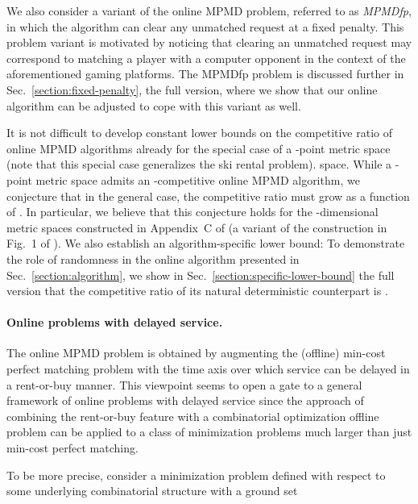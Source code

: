 \documentclass[11pt]{article}
\def\LongVersion{}
\def\LongVersionEnd{}
\def\ShortVersion{}
\def\ShortVersionEnd{}
\theoremstyle{definition}
\theoremstyle{plain}
\theoremstyle{definition}
\theoremstyle{plain}
\theoremstyle{definition}
\theoremstyle{plain}
\newcommand{\Sect}{Sec.}
\begin{document}
We also consider a variant of the online MPMD problem, referred to as
\emph{MPMDfp}, in which the algorithm can clear any unmatched request at a
fixed penalty.
This problem variant is motivated by noticing that clearing an unmatched
request may correspond to matching a player with a computer opponent in the
context of the aforementioned gaming platforms.
The MPMDfp problem is discussed further in
\LongVersion \Sect{}~\ref{section:fixed-penalty},
\LongVersionEnd \ShortVersion the full version,
\ShortVersionEnd where we show that our online algorithm can be adjusted to cope with this
variant as well.

It is not difficult to develop constant lower bounds on the competitive ratio
of online MPMD algorithms already for the special case of a -point metric
\LongVersion space (note that this special case generalizes the ski rental problem).
\LongVersionEnd \ShortVersion space.
\ShortVersionEnd While a -point metric space admits an -competitive online MPMD
algorithm, we conjecture that in the general case, the competitive ratio must
grow as a function of .
In particular, we believe that this conjecture holds for the -dimensional
metric spaces constructed in Appendix~C of \cite{EmekLW2015} (a variant of the
construction in Fig.~1 of \cite{ReingoldT1981}).
We also establish an algorithm-specific lower bound:
To demonstrate the role of randomness in the online algorithm presented in
\Sect{}~\ref{section:algorithm}, we show in
\LongVersion \Sect{}~\ref{section:specific-lower-bound}
\LongVersionEnd \ShortVersion the full version
\ShortVersionEnd that the competitive ratio of its natural deterministic counterpart is .

\paragraph{Online problems with delayed service.}
The online MPMD problem is obtained by augmenting the (offline) min-cost
perfect matching problem with the time axis over which service can be delayed
in a rent-or-buy manner.
This viewpoint seems to open a gate to a general framework of online problems
with delayed service since the approach of combining the rent-or-buy feature
with a combinatorial optimization offline problem can be applied to a class of
minimization problems much larger than just min-cost perfect matching.

To be more precise, consider a minimization problem  defined with
respect to some underlying combinatorial structure  with a ground
set
\end{document}
